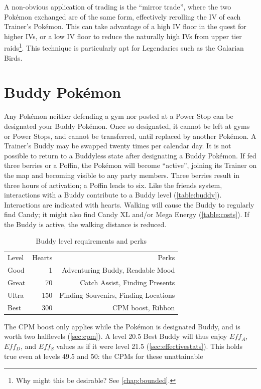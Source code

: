 A non-obvious application of trading is the ``mirror trade'', where the
 two Pokémon exchanged are of the same form, effectively rerolling the IV of each Trainer's Pokémon.
This can take advantage of a high IV floor in the quest for higher IVs, or
 a low IV floor to reduce the naturally high IVs from upper tier raids\footnote{Why might this be desirable? See \autoref{chap:bounded}.}.
This technique is particularly apt for Legendaries such as the Galarian Birds.

\section{Buddy Pokémon\label{sec:buddies}}
Any Pokémon neither defending a gym nor posted at a Power Stop can be designated your Buddy Pokémon.
Once so designated, it cannot be left at gyms or Power Stops, and cannot be transferred,
  until replaced by another Pokémon.
A Trainer's Buddy may be swapped twenty times per calendar day.
It is not possible to return to a Buddyless state after designating a Buddy Pokémon.
If fed three berries or a Poffin, the Pokémon will become ``active'',
  joining its Trainer on the map and becoming visible to any party members.
Three berries result in three hours of activation; a Poffin leads to six.
Like the friends system, interactions with a Buddy contribute to a Buddy level (\autoref{table:buddy}).
Interactions are indicated with hearts.
Walking will cause the Buddy to regularly find Candy; it might also find Candy XL
  and/or Mega Energy (\autoref{table:costs}).
If the Buddy is active, the walking distance is reduced.
\begin{table}
\centering
\begin{tabular}{lrr}
Level & Hearts & Perks\\
\Midrule
Good & 1 & Adventuring Buddy, Readable Mood\\
Great & 70 & Catch Assist, Finding Presents\\
Ultra & 150 & Finding Souvenirs, Finding Locations\\
Best & 300 & CPM boost, Ribbon\\
\end{tabular}
  \caption{Buddy level requirements and perks\label{table:buddy}}
\end{table}
The CPM boost only applies while the Pokémon is designated Buddy,
  and is worth two halflevels (\autoref{sec:cpm}).
A level 20.5 Best Buddy will thus enjoy $Eff_A$, $Eff_D$, and $Eff_S$ values
  as if it were level 21.5 (\autoref{sec:effectivestats}).
This holds true even at levels 49.5 and 50: the CPMs for these unattainable
